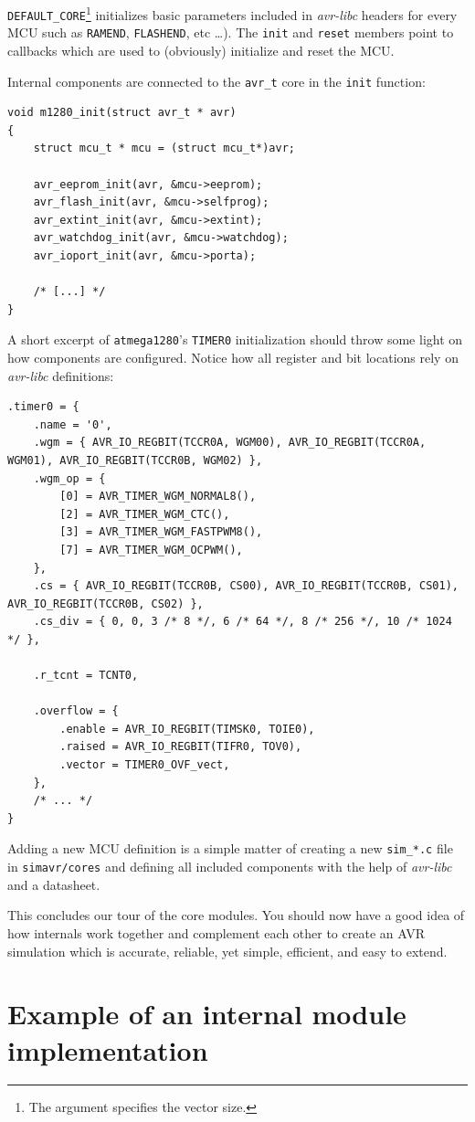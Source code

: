 \lstinline|DEFAULT_CORE|\footnote{
%
The argument specifies the vector size.
%
} initializes basic parameters included in \emph{avr-libc}
headers for every \ac{MCU} such as \lstinline|RAMEND|, \lstinline|FLASHEND|,
etc \ldots). The \lstinline|init| and \lstinline|reset| members point to callbacks
which are used to (obviously) initialize and reset the \ac{MCU}.

Internal components are connected to the \lstinline|avr_t| core in the
\lstinline|init| function:

\begin{lstlisting}
void m1280_init(struct avr_t * avr)
{
    struct mcu_t * mcu = (struct mcu_t*)avr;

    avr_eeprom_init(avr, &mcu->eeprom);
    avr_flash_init(avr, &mcu->selfprog);
    avr_extint_init(avr, &mcu->extint);
    avr_watchdog_init(avr, &mcu->watchdog);
    avr_ioport_init(avr, &mcu->porta);

    /* [...] */
}
\end{lstlisting}

A short excerpt of \verb|atmega1280|'s \lstinline|TIMER0| initialization should
throw some light on how components are configured. Notice how all register and
bit locations rely on \emph{avr-libc} definitions:

\begin{lstlisting}
.timer0 = {
    .name = '0',
    .wgm = { AVR_IO_REGBIT(TCCR0A, WGM00), AVR_IO_REGBIT(TCCR0A, WGM01), AVR_IO_REGBIT(TCCR0B, WGM02) },
    .wgm_op = {
        [0] = AVR_TIMER_WGM_NORMAL8(),
        [2] = AVR_TIMER_WGM_CTC(),
        [3] = AVR_TIMER_WGM_FASTPWM8(),
        [7] = AVR_TIMER_WGM_OCPWM(),
    },
    .cs = { AVR_IO_REGBIT(TCCR0B, CS00), AVR_IO_REGBIT(TCCR0B, CS01), AVR_IO_REGBIT(TCCR0B, CS02) },
    .cs_div = { 0, 0, 3 /* 8 */, 6 /* 64 */, 8 /* 256 */, 10 /* 1024 */ },

    .r_tcnt = TCNT0,

    .overflow = {
        .enable = AVR_IO_REGBIT(TIMSK0, TOIE0),
        .raised = AVR_IO_REGBIT(TIFR0, TOV0),
        .vector = TIMER0_OVF_vect,
    },
    /* ... */
}
\end{lstlisting}

Adding a new \ac{MCU} definition is a simple matter of creating a new \verb|sim_*.c|
file in \verb|simavr/cores| and defining all included components with the help
of \emph{avr-libc} and a datasheet.

This concludes our tour of the \simavr core modules. You should now have a
good idea of how \simavr internals work together and complement each
other to create an \ac{AVR} simulation which is accurate, reliable, yet simple,
efficient, and easy to extend.


\section{Example of an internal module implementation} %

